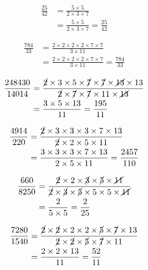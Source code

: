 {{\item\begin{align*}
    \frac{25}{42} &=
    \frac{5 \times 5}
    {2 \times 3 \times 7}\\ &=
    \frac{5 \times 5}
    {2 \times 3 \times 7} =
    \frac{25}{42}
    \end{align*}

\item\begin{align*}
    \frac{784}{33} &=
    \frac{2 \times 2 \times 2 \times 2 \times 7 \times 7}
    {3 \times 11}\\ &=
    \frac{2 \times 2 \times 2 \times 2 \times 7 \times 7}
    {3 \times 11} =
    \frac{784}{33}
    \end{align*}

\item\begin{align*}
    \frac{248430}{14014} &=
    \frac{\cancel{2} \times 3 \times 5 \times \cancel{7} \times \cancel{7} \times \cancel{13} \times 13}
    {\cancel{2} \times \cancel{7} \times \cancel{7} \times 11 \times \cancel{13}}\\ &=
    \frac{3 \times 5 \times 13}
    {11} =
    \frac{195}{11}
    \end{align*}

\item\begin{align*}
    \frac{4914}{220} &=
    \frac{\cancel{2} \times 3 \times 3 \times 3 \times 7 \times 13}
    {\cancel{2} \times 2 \times 5 \times 11}\\ &=
    \frac{3 \times 3 \times 3 \times 7 \times 13}
    {2 \times 5 \times 11} =
    \frac{2457}{110}
    \end{align*}

\item\begin{align*}
    \frac{660}{8250} &=
    \frac{\cancel{2} \times 2 \times \cancel{3} \times \cancel{5} \times \cancel{11}}
    {\cancel{2} \times \cancel{3} \times \cancel{5} \times 5 \times 5 \times \cancel{11}}\\ &=
    \frac{2}
    {5 \times 5} =
    \frac{2}{25}
    \end{align*}

\item\begin{align*}
    \frac{7280}{1540} &=
    \frac{\cancel{2} \times \cancel{2} \times 2 \times 2 \times \cancel{5} \times \cancel{7} \times 13}
    {\cancel{2} \times \cancel{2} \times \cancel{5} \times \cancel{7} \times 11}\\ &=
    \frac{2 \times 2 \times 13}
    {11} =
    \frac{52}{11}
    \end{align*}

}}
